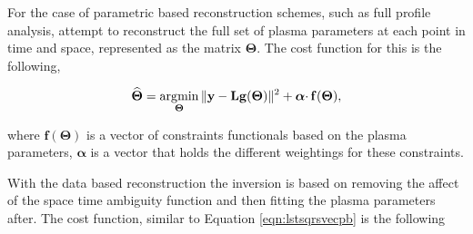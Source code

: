 %
%
%
%
%


For the case of parametric based reconstruction schemes, such as full profile analysis, attempt to reconstruct the full set of plasma parameters at each point in time and space, represented as the matrix $\boldsymbol{\Theta}$. The cost function for this is the following, 

\begin{equation}
\label{eqn:lstsqrsvecpb}
\widehat{\boldsymbol{\Theta}} = \operatorname*{\arg\!\min}\limits_{\boldsymbol{\Theta}} \|\mathbf{y} -\mathbf{L}\mathbf{ g}(\boldsymbol{\Theta}) \|^2 + \boldsymbol{\alpha}\cdotp\mathbf{f}(\boldsymbol{\Theta}),
\end{equation}

\noindent where $\mathbf{f}(\boldsymbol{\Theta})$ is a vector of constraints functionals based on the plasma parameters, $\boldsymbol{\alpha}$ is a vector that holds the different weightings for these constraints.

With the data based reconstruction the inversion is based on removing the affect of the space time ambiguity function and then fitting the plasma parameters after. The cost function, similar to Equation \ref{eqn:lstsqrsvecpb} is the following

